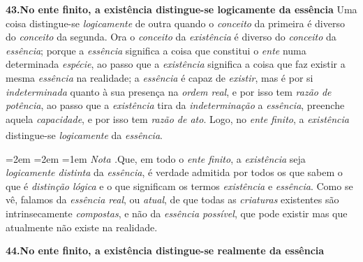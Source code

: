 \documentclass[12pt,a4paper]{article}
\newcommand{\tese}[2]{\bigskip\noindent\textbf{#1.\quad #2}\;\textemdash\;}
\newcommand{\teseB}[2]{\bigskip\noindent\textbf{#1.\quad #2}\par}
\renewcommand\footnote[1]{%
    \stepcounter{footnote}\textsuperscript{\thefootnote}%
    \par
    {\footnotesize
     \leftskip=2em \rightskip=2em \parindent=1em
     \addvspace{\medskipamount}%
     \noindent\textit{Nota \thefootnote.}\enspace #1\par
     \addvspace{\medskipamount}}%
  }
\begin{document}
\tese{43}{No ente finito, a existência distingue-se logicamente da essência}
Uma coisa distingue-se \emph{logicamente} de outra quando o \emph{conceito} da
primeira é diverso do \emph{conceito} da segunda. Ora o \emph{conceito} da
\emph{existência} é diverso do \emph{conceito} da \emph{essência}; porque
\textemdash{} a \emph{essência} significa a coisa que constitui o \emph{ente}
numa determinada \emph{espécie}, ao passo que a \emph{existência} significa a
coisa que faz existir a mesma \emph{essência} na realidade; \textemdash{} a
\emph{essência} é capaz de \emph{existir}, mas é por si \emph{indeterminada}
quanto à sua presença na \emph{ordem real}, e por isso tem \emph{razão de
potência}, ao passo que a \emph{existência} tira da \emph{indeterminação} a
\emph{essência}, preenche aquela \emph{capacidade}, e por isso tem \emph{razão
de ato}. Logo, no \emph{ente finito}, a \emph{existência} distingue-se
\emph{logicamente} da \emph{essência}.\footnote{Que, em todo o \emph{ente
finito}, a \emph{existência} seja \emph{logicamente distinta} da \emph{essência},
é verdade admitida por todos os que sabem o que é \emph{distinção lógica} e o
que significam os termos \textemdash{} \emph{existência} e \emph{essência}.
\textemdash{} Como se vê, falamos da \emph{essência real}, ou \emph{atual}, de
que todas as \emph{criaturas} existentes são intrinsecamente \emph{compostas},
e não da \emph{essência possível}, que pode existir mas que atualmente não
existe na realidade.}

\teseB{44}{No ente finito, a existência distingue-se realmente da essência}
\end{document}
